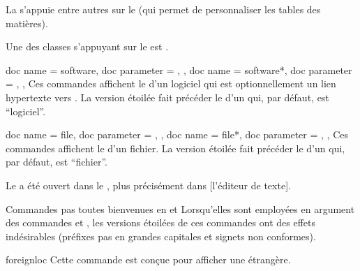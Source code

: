 \documentclass{letgut}
\begin{document}
\begin{ltx-code-result}[title addon=packages et classes,listing options app={deletekeywords={[4]{tables}}}]
La  s'appuie entre autres sur le 
(qui permet de personnaliser les tables des matières).

Une des classes s'appuyant sur le  est
.
\end{ltx-code-result}

\begin{docCommands}
  {
    {
      doc name = software,
      doc parameter = ,
    },
    {
      doc name = software*,
      doc parameter = ,
    },
  }
  Ces commandes affichent le  d'un logiciel qui est optionnellement un
  lien hypertexte vers .  La version étoilée fait précéder le
   d'un  qui, par défaut, est \enquote{logiciel}.
\end{docCommands}

\begin{docCommands}
  {
    {
      doc name = file,
      doc parameter = ,
    },
    {
      doc name = file*,
      doc parameter = ,
    },
  }
  Ces commandes affichent le  d'un fichier.  La version étoilée fait
  précéder le  d'un  qui, par défaut, est
  \enquote{fichier}.
\end{docCommands}

\begin{ltx-code-result}[title addon=logiciels et fichiers,listing options app={deletekeywords={[3]{file,plus,l,tex}}}]
Le  a été ouvert dans le
, plus
précisément dans [l'éditeur de texte].
\end{ltx-code-result}

\begin{dbwarning}{Commandes pas toutes bienvenues en  et
    }{}
  Lorsqu'elles sont employées en argument des commandes  et
  , les versions étoilées de ces commandes ont des effets
  indésirables (préfixes pas en grandes capitales et signets non conformes).
\end{dbwarning}

\begin{docCommand}{foreignloc}{}
  Cette commande est conçue pour afficher une  étrangère.
\end{docCommand}
\end{document}
